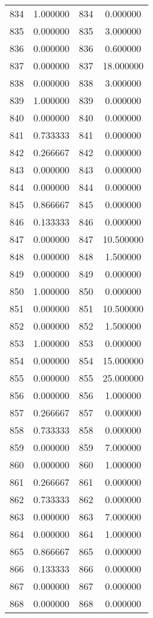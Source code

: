 \documentclass[12pt]{article}
\begin{document}
\begin{longtable}{@{}cccc@{}}
834 & 1.000000 & 834 & 0.000000 \\
835 & 0.000000 & 835 & 3.000000 \\
836 & 0.000000 & 836 & 0.600000 \\
837 & 0.000000 & 837 & 18.000000 \\
838 & 0.000000 & 838 & 3.000000 \\
839 & 1.000000 & 839 & 0.000000 \\
840 & 0.000000 & 840 & 0.000000 \\
841 & 0.733333 & 841 & 0.000000 \\
842 & 0.266667 & 842 & 0.000000 \\
843 & 0.000000 & 843 & 0.000000 \\
844 & 0.000000 & 844 & 0.000000 \\
845 & 0.866667 & 845 & 0.000000 \\
846 & 0.133333 & 846 & 0.000000 \\
847 & 0.000000 & 847 & 10.500000 \\
848 & 0.000000 & 848 & 1.500000 \\
849 & 0.000000 & 849 & 0.000000 \\
850 & 1.000000 & 850 & 0.000000 \\
851 & 0.000000 & 851 & 10.500000 \\
852 & 0.000000 & 852 & 1.500000 \\
853 & 1.000000 & 853 & 0.000000 \\
854 & 0.000000 & 854 & 15.000000 \\
855 & 0.000000 & 855 & 25.000000 \\
856 & 0.000000 & 856 & 1.000000 \\
857 & 0.266667 & 857 & 0.000000 \\
858 & 0.733333 & 858 & 0.000000 \\
859 & 0.000000 & 859 & 7.000000 \\
860 & 0.000000 & 860 & 1.000000 \\
861 & 0.266667 & 861 & 0.000000 \\
862 & 0.733333 & 862 & 0.000000 \\
863 & 0.000000 & 863 & 7.000000 \\
864 & 0.000000 & 864 & 1.000000 \\
865 & 0.866667 & 865 & 0.000000 \\
866 & 0.133333 & 866 & 0.000000 \\
867 & 0.000000 & 867 & 0.000000 \\
868 & 0.000000 & 868 & 0.000000 \\

\end{longtable}
\end{document}
